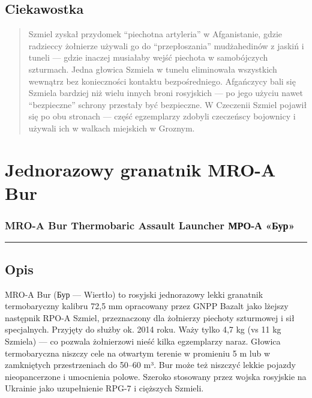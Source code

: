 \documentclass[12pt,openany,oneside]{book}
\begin{document}
\section{Ciekawostka}\label{ciekawostka-77}

\begin{quote}
Szmiel zyskał przydomek ``piechotna artyleria'' w Afganistanie, gdzie
radzieccy żołnierze używali go do ``przepłoszania'' mudżahedinów z
jaskiń i tuneli --- gdzie inaczej musiałaby wejść piechota w
samobójczych szturmach. Jedna głowica Szmiela w tunelu eliminowała
wszystkich wewnątrz bez konieczności kontaktu bezpośredniego. Afgańczycy
bali się Szmiela bardziej niż wielu innych broni rosyjskich --- po jego
użyciu nawet ``bezpieczne'' schrony przestały być bezpieczne. W
Czeczenii Szmiel pojawił się po obu stronach --- część egzemplarzy
zdobyli czeczeńscy bojownicy i używali ich w walkach miejskich w
Groznym.
\end{quote}

\chapter{Jednorazowy granatnik MRO-A
Bur}\label{jednorazowy-granatnik-mro-a-bur}

\subsection{MRO-A Bur Thermobaric Assault Launcher \textbar{} МРО-А
«Бур»}\label{mro-a-bur-thermobaric-assault-launcher-ux43cux440ux43e-ux430-ux431ux443ux440}

\begin{center}\rule{0.5\linewidth}{0.5pt}\end{center}

\section{Opis}\label{opis-78}

MRO-A Bur (Бур --- Wiertło) to rosyjski jednorazowy lekki granatnik
termobaryczny kalibru 72,5 mm opracowany przez GNPP Bazalt jako lżejszy
następnik RPO-A Szmiel, przeznaczony dla żołnierzy piechoty szturmowej i
sił specjalnych. Przyjęty do służby ok. 2014 roku. Waży tylko 4,7 kg (vs
11 kg Szmiela) --- co pozwala żołnierzowi nieść kilka egzemplarzy naraz.
Głowica termobaryczna niszczy cele na otwartym terenie w promieniu 5 m
lub w zamkniętych przestrzeniach do 50--60 m³. Bur może też niszczyć
lekkie pojazdy nieopancerzone i umocnienia polowe. Szeroko stosowany
przez wojska rosyjskie na Ukrainie jako uzupełnienie RPG-7 i cięższych
Szmieli.
\end{document}

